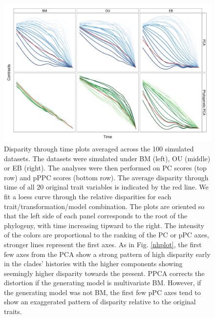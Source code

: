 \documentclass[a4paper,11pt]{article}
\begin{document}
\begin{figure}[p]
\centering
\includegraphics[scale=0.65]{./fig/dtt-2panel.pdf}
\caption{Disparity through time plots averaged across the 100 simulated datasets. The datasets were simulated under BM (left), OU (middle) or EB (right). The analyses were then performed on PC scores (top row) and pPPC scores (bottom row). The average disparity through time of all 20 original trait variables is indicated by the red line. We fit a loess curve through the relative disparities for each trait/transformation/model combination. The plots are oriented so that the left side of each panel corresponds to the root of the phylogeny, with time increasing tipward to the right. The intensity of the colors are proportional to the ranking of the PC or pPC axes, stronger lines represent the first axes. As in Fig. \ref{nhplot}, the first few axes from the PCA show a strong pattern of high disparity early in the clades' histories with the higher components showing seemingly higher disparity towards the present. PPCA corrects the distortion if the generating model is multivariate BM. However, if the generating model was not BM, the first few pPC axes tend to show an exaggerated pattern of disparity relative to the original traits.}
\label{dttplot}
\end{figure}

\renewcommand\thefigure{S\arabic{figure}}
\renewcommand\thetable{S \arabic{table}}
\setcounter{figure}{0}    
\setcounter{table}{0}
\end{document}
